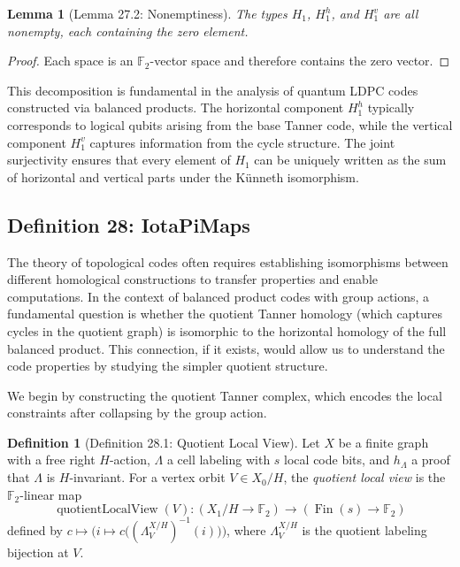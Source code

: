 \documentclass[11pt]{article}
\theoremstyle{plain}
\newtheorem*{lemma}{Lemma}
\theoremstyle{definition}
\newtheorem*{definition}{Definition}
\theoremstyle{remark}
\begin{document}
\begin{lemma}[Lemma 27.2: Nonemptiness]
The types $H_1$, $H_1^h$, and $H_1^v$ are all nonempty, each containing the zero element.
\end{lemma}

\begin{proof}
Each space is an $\mathbb{F}_2$-vector space and therefore contains the zero vector.
\end{proof}

This decomposition is fundamental in the analysis of quantum LDPC codes constructed via balanced products. The horizontal component $H_1^h$ typically corresponds to logical qubits arising from the base Tanner code, while the vertical component $H_1^v$ captures information from the cycle structure. The joint surjectivity ensures that every element of $H_1$ can be uniquely written as the sum of horizontal and vertical parts under the Künneth isomorphism.

\vspace{1em}

\subsection{Definition 28: IotaPiMaps}

The theory of topological codes often requires establishing isomorphisms between different homological constructions to transfer properties and enable computations. In the context of balanced product codes with group actions, a fundamental question is whether the quotient Tanner homology (which captures cycles in the quotient graph) is isomorphic to the horizontal homology of the full balanced product. This connection, if it exists, would allow us to understand the code properties by studying the simpler quotient structure.

We begin by constructing the quotient Tanner complex, which encodes the local constraints after collapsing by the group action.

\begin{definition}[Definition 28.1: Quotient Local View]
Let $X$ be a finite graph with a free right $H$-action, $\Lambda$ a cell labeling with $s$ local code bits, and $h_\Lambda$ a proof that $\Lambda$ is $H$-invariant. For a vertex orbit $V \in X_0/H$, the \emph{quotient local view} is the $\mathbb{F}_2$-linear map
\[
\operatorname{quotientLocalView}(V) : (X_1/H \to \mathbb{F}_2) \to (\operatorname{Fin}(s) \to \mathbb{F}_2)
\]
defined by $c \mapsto \bigl(i \mapsto c\bigl((\Lambda^{X/H}_V)^{-1}(i)\bigr)\bigr)$, where $\Lambda^{X/H}_V$ is the quotient labeling bijection at $V$.
\end{definition}
\end{document}

